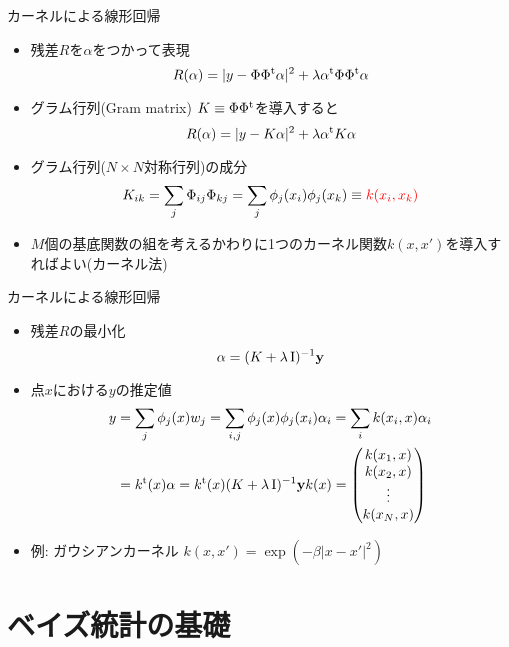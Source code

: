 \documentclass[dvipdfmx]{beamer}
\begin{document}
\begin{frame}[t,fragile]{カーネルによる線形回帰}
  \begin{itemize}
  \item 残差$R$を$\alpha$をつかって表現
    \[
    R(\alpha) = | y - \Phi \Phi^{\rm t} \alpha |^2 + \lambda \alpha^{\rm t} \Phi \Phi^{\rm t} \alpha
    \]
  \item グラム行列(Gram matrix) $K \equiv \Phi \Phi^{\rm t}$を導入すると
    \[
    R(\alpha) = | y - K \alpha |^2 + \lambda \alpha^{\rm t} K \alpha
    \]
  \item グラム行列($N \times N$対称行列)の成分
    \[
    K_{ik} = \sum_j \Phi_{ij} \Phi_{kj} = \sum_j \phi_j(x_i) \phi_j(x_k) \equiv {\color{red} k(x_i,x_k)}
    \]
  \item $M$個の基底関数の組を考えるかわりに1つのカーネル関数$k(x,x')$を導入すればよい(カーネル法)
  \end{itemize}
\end{frame}

\begin{frame}[t,fragile]{カーネルによる線形回帰}
  \begin{itemize}
  \item 残差$R$の最小化
    \[
    \alpha = (K + \lambda \, {\rm I})^{-1} {\bf y}
    \]
  \item 点$x$における$y$の推定値
    \begin{align*}
    y &= \sum_j \phi_j(x) w_j = \sum_{i,j} \phi_j(x) \phi_j(x_i) \alpha_i = \sum_i k(x_i,x) \alpha_i \\ &= k^{\rm t}(x) \alpha = k^{\rm t}(x) (K + \lambda \, {\rm I})^{-1} {\bf y}
k(x) = \begin{pmatrix} k(x_1,x) \\ k(x_2,x) \\ \vdots \\ k(x_N,x) \end{pmatrix}
    \end{align*}
  \item 例: ガウシアンカーネル $k(x,x') = \exp(-\beta|x-x'|^2)$
  \end{itemize}
\end{frame}

\section{ベイズ統計の基礎}
\end{document}
